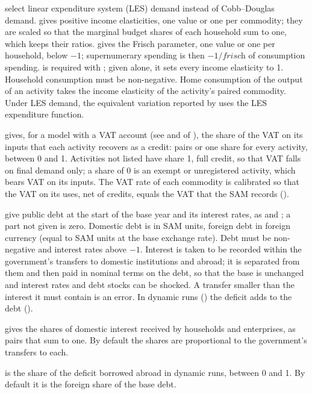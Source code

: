 \begin{optdesc}
\item[\optarg{inc}{elas}{numlist} and \optarg{fris}{ch}{numlist}] select linear
expenditure system (LES) demand instead of Cobb--Douglas demand.
 gives positive income elasticities, one value or one per
commodity; they are scaled so that the marginal budget shares of each
household sum to one, which keeps their ratios.  gives the Frisch
parameter, one value or one per household, below $-1$; supernumerary spending
is then $-1/\textit{frisch}$ of consumption spending.  is
required with ; given alone, it sets every income elasticity to
1. Household consumption must be non-negative. Home consumption of the output
of an activity takes the income elasticity of the activity's paired commodity.
Under LES demand, the equivalent variation reported by 
uses the LES expenditure function.
\end{optdesc}


\begin{optdesc}
\item[\optarg{vatc}{redit}{spec}] gives, for a model with a VAT account (see
 and  of ), the share of the VAT
on its inputs that each activity recovers as a credit:
\cmd{:} pairs or one share for every activity,
between 0 and 1. Activities not listed have share 1, full credit, so that VAT
falls on final demand only; a share of 0 is an exempt or unregistered activity,
which bears VAT on its inputs. The VAT rate of each commodity is calibrated so
that the VAT on its uses, net of credits, equals the VAT that the SAM records
().

\item[\optarg{}{debt}{spec} and \optarg{int}{erest}{spec}] give public debt at
the start of the base year and its interest rates, as \argu{\#}
and \argu{\#}; a part not given is zero. Domestic debt is in SAM
units, foreign debt in foreign currency (equal to SAM units at the base
exchange rate). Debt must be non-negative and interest rates above $-1$.
Interest is taken to be recorded within the government's transfers to
domestic institutions and abroad; it is separated from them and then paid in
nominal terms on the debt, so that the base is unchanged and interest rates
and debt stocks can be shocked. A transfer smaller than the interest it must
contain is an error. In dynamic runs () the deficit adds to
the debt ().

\item[\optarg{debth}{olders}{spec}] gives the shares of domestic interest
received by households and enterprises, as \cmd{:}
pairs that sum to one. By default the shares are proportional to the
government's transfers to each.

\item[\optarg{for}{eignborrowing}{\#}] is the share of the deficit borrowed
abroad in dynamic runs, between 0 and 1. By default it is the foreign share of
the base debt.
\end{optdesc}

